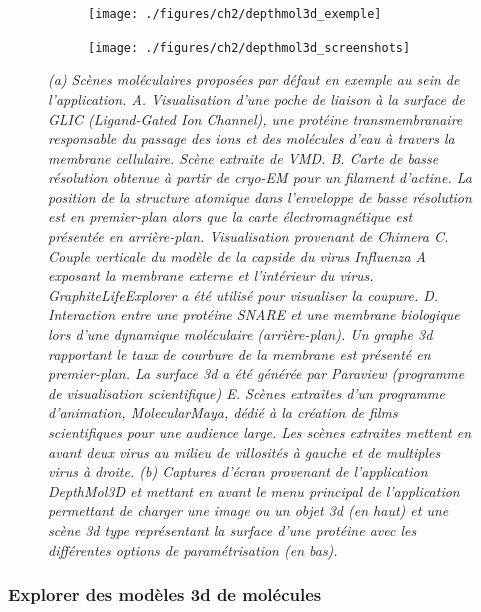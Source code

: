 \begin{figure}
\begin{subfigure}
  \centering
  {\texttt{[image: ./figures/ch2/depthmol3d\_exemple]}}
    \caption{}
  \label{Fig:depthmol3d_exemple}
\end{subfigure}
\begin{subfigure}
  \centering
  {\texttt{[image: ./figures/ch2/depthmol3d\_screenshots]}}
    \caption{}
  \label{Fig:depthmol3d_screenshots}
\end{subfigure}
\caption{{\it (a) Scènes moléculaires proposées par défaut en exemple au sein de l'application.
A. Visualisation d'une poche de liaison à la surface de GLIC (Ligand-Gated Ion Channel), une protéine transmembranaire responsable du passage des ions et des molécules d'eau à travers la membrane cellulaire. Scène extraite de VMD. B. Carte de basse résolution obtenue à partir de cryo-EM pour un filament d'actine. La position de la structure atomique dans l'enveloppe de basse résolution est en premier-plan alors que la carte électromagnétique est présentée en arrière-plan. Visualisation provenant de Chimera C. Couple verticale du modèle de la capside du virus Influenza A exposant la membrane externe et l'intérieur du virus. GraphiteLifeExplorer a été utilisé pour visualiser la coupure. D. Interaction entre une protéine SNARE et une membrane biologique lors d'une dynamique moléculaire (arrière-plan). Un graphe 3d rapportant le taux de courbure de la membrane est présenté en premier-plan. La surface 3d a été générée par Paraview (programme de visualisation scientifique) E. Scènes extraites d'un programme d'animation, MolecularMaya, dédié à la création de films scientifiques pour une audience large. Les scènes extraites mettent en avant deux virus au milieu de villosités à gauche et de multiples virus à droite.
(b) Captures d'écran provenant de l'application DepthMol3D et mettant en avant le menu principal de l'application permettant de charger une image ou un objet 3d (en haut) et une scène 3d type représentant la surface d'une protéine avec les différentes options de paramétrisation (en bas).}}
\end{figure}

\subsubsection{Explorer des modèles 3d de molécules}

